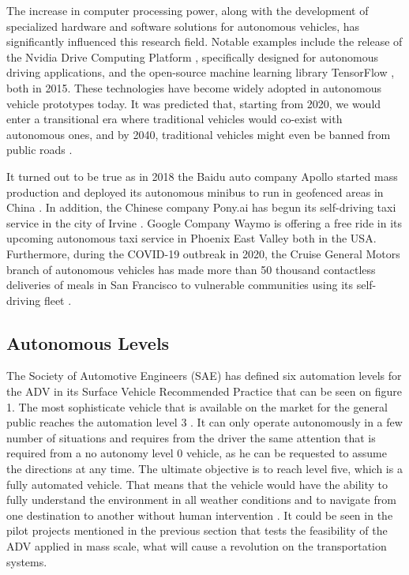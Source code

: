 The increase in computer processing power, along with the development of specialized hardware and software solutions for autonomous vehicles, has significantly influenced this research field. Notable examples include the release of the Nvidia Drive Computing Platform \cite{NvidiaDrive}, specifically designed for autonomous driving applications, and the open-source machine learning library TensorFlow \cite{TensorFlow}, both in 2015. These technologies have become widely adopted in autonomous vehicle prototypes today. It was predicted that, starting from 2020, we would enter a transitional era where traditional vehicles would co-exist with autonomous ones, and by 2040, traditional vehicles might even be banned from public roads \cite{Liu2017c}.

It turned out to be true as in 2018 the Baidu auto company Apollo started mass production and deployed its autonomous minibus to run in geofenced areas in China \cite{Apollo}. In addition, the Chinese company Pony.ai has begun its self-driving taxi service in the city of Irvine \cite{Pony}. Google Company Waymo is offering a free ride in its upcoming autonomous taxi service in Phoenix East Valley \cite{waymo} both in the USA. Furthermore, during the COVID-19 outbreak in 2020, the Cruise General Motors branch of autonomous vehicles has made more than 50 thousand contactless deliveries of meals in San Francisco to vulnerable communities using its self-driving fleet \cite{Cruise}. %

\subsection{Autonomous Levels}

The Society of Automotive Engineers (SAE) has defined six automation levels for the ADV in its Surface Vehicle Recommended Practice \cite{SAE} that can be seen on figure 1. The most sophisticate vehicle that is available on the market for the general public reaches the automation level 3 \cite{Belcarz2018}. It can only operate autonomously in a few number
of situations and requires from the driver the same attention that is required from a no autonomy level 0 vehicle, as he can be requested to assume the directions at any time. The ultimate objective is to reach level five, which is a fully automated vehicle. That means that the vehicle would have the ability to fully understand the environment in all weather conditions and to navigate from one destination to another without human intervention \cite{Lin2018}. It could be seen in the pilot projects mentioned in the previous section that tests the feasibility of the ADV applied in mass scale, what will cause a revolution on the transportation systems.


